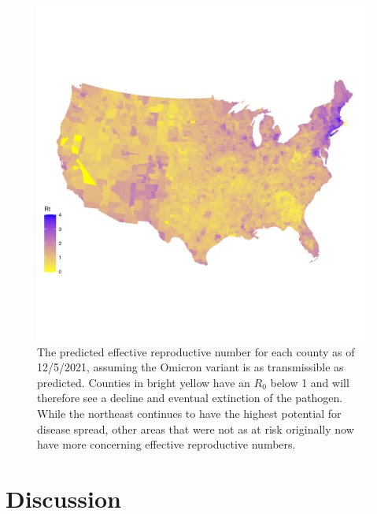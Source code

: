 \documentclass[
  12pt,
]{article}
\begin{document}
\begin{figure}[H]

{\centering \includegraphics{Final-Manuscript_files/figure-latex/fig6-1} 

}

\caption{The predicted effective reproductive number for each county as of 12/5/2021, assuming the Omicron variant is as transmissible as predicted. Counties in bright yellow have an \(R_0\) below 1 and will therefore see a decline and eventual extinction of the pathogen. While the northeast continues to have the highest potential for disease spread, other areas that were not as at risk originally now have more concerning effective reproductive numbers.}\label{fig:fig6}
\end{figure}

\hypertarget{discussion}{%
\section{Discussion}\label{discussion}}
\end{document}
